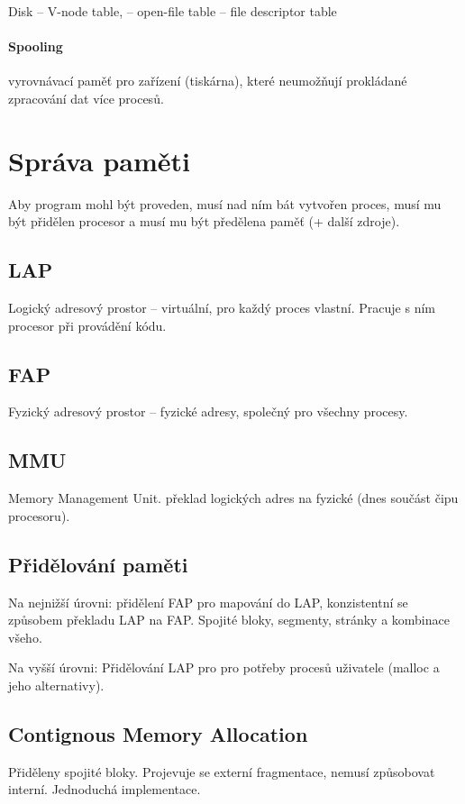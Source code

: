 \documentclass[a4wide]{report}
\begin{document}
Disk -- V-node table, -- open-file table -- file descriptor table

\paragraph{Spooling} vyrovnávací paměť pro zařízení (tiskárna), které neumožňují prokládané zpracování dat více procesů.


\section{Správa paměti}

Aby program mohl být proveden, musí nad ním bát vytvořen proces, musí mu být přidělen procesor a musí mu být předělena paměť (+ další zdroje).

\subsection{LAP}
Logický adresový prostor -- virtuální, pro každý proces vlastní. Pracuje s ním procesor při provádění kódu.

\subsection{FAP}
Fyzický adresový prostor -- fyzické adresy, společný pro všechny procesy.

\subsection{MMU}
Memory Management Unit. překlad logických adres na fyzické (dnes součást čipu procesoru).

\subsection{Přidělování paměti}
Na nejnižší úrovni: přidělení FAP pro mapování do LAP, konzistentní se způsobem překladu LAP na FAP. Spojité bloky, segmenty, stránky a kombinace všeho.

Na vyšší úrovni: Přidělování LAP pro pro potřeby procesů uživatele (malloc a jeho alternativy).

\subsection{Contignous Memory Allocation}

Přiděleny spojité bloky. Projevuje se externí fragmentace, nemusí způsobovat interní. Jednoduchá implementace.
\end{document}
